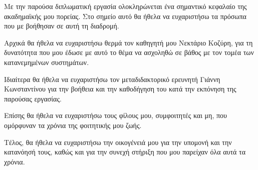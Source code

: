 \begin{acknowledgementsgr}

Με την παρούσα διπλωματική εργασία ολοκληρώνεται ένα σημαντικό κεφαλαίο της ακαδημαϊκής μου πορείας. Στο σημείο αυτό θα ήθελα να ευχαριστήσω τα πρόσωπα που με βοήθησαν σε αυτή τη διαδρομή.

Αρχικά θα ήθελα να ευχαριστήσω θερμά τον καθηγητή μου Νεκτάριο Κοζύρη, για τη δυνατότητα που μου έδωσε με αυτό το θέμα να ασχοληθώ σε βάθος με τον τομέα των κατανεμημένων συστημάτων.

Ιδιαίτερα θα ήθελα να ευχαριστήσω τον μεταδιδακτορικό ερευνητή Γιάννη
Κωνσταντίνου για την βοήθεια και την καθοδήγηση του κατά την εκπόνηση της
παρούσας εργασίας.

Επίσης θα ήθελα να ευχαριστήσω τους φίλους μου, συμφοιτητές και μη, που ομόρφυναν τα χρόνια της φοιτητικής μου ζωής.

Τέλος, θα ήθελα να ευχαριστήσω την οικογένειά μου για την υπομονή και την κατανόησή τους, καθώς και για την συνεχή στήριξη που μου παρείχαν όλα αυτά τα χρόνια.

\end{acknowledgementsgr}

